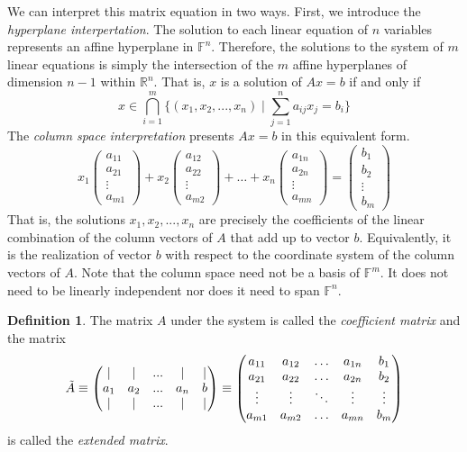 \documentclass{article}
\theoremstyle{remark}
\theoremstyle{definition}
\newtheorem{definition}{Definition}[section]
\begin{document}
    We can interpret this matrix equation in two ways. First, we introduce the \textit{hyperplane interpertation}. The solution to each linear equation of $n$ variables represents an affine hyperplane in $\mathbb{F}^n$. Therefore, the solutions to the system of $m$ linear equations is simply the intersection of the $m$ affine hyperplanes of dimension $n-1$ within $\mathbb{R}^n$. That is, $x$ is a solution of $A x = b$ if and only if  
    \[ x \in \bigcap_{i = 1}^m \Big\{ (x_1, x_2, ..., x_n) \; | \; \sum_{j = 1}^n a_{i j} x_j = b_i \Big\} \]
    The \textit{column space interpretation} presents $A x = b$ in this equivalent form. 
    \[ x_1 \begin{pmatrix}
    a_{1 1} \\ a_{2 1} \\ \vdots \\ a_{m 1}
    \end{pmatrix} + x_2 \begin{pmatrix}
    a_{1 2} \\ a_{2 2} \\ \vdots \\ a_{m 2}
    \end{pmatrix} + \ldots + x_n \begin{pmatrix}
    a_{1 n} \\ a_{2 n} \\ \vdots \\ a_{m n}
    \end{pmatrix} = \begin{pmatrix}
    b_1 \\ b_2 \\ \vdots \\ b_m
    \end{pmatrix}\]
    That is, the solutions $x_1, x_2, ..., x_n$ are precisely the coefficients of the linear combination of the column vectors of $A$ that add up to vector $b$. Equivalently, it is the realization of vector $b$ with respect to the coordinate system of the column vectors of $A$. Note that the column space need not be a basis of $\mathbb{F}^m$. It does not need to be linearly independent nor does it need to span $\mathbb{F}^n$. 

    \begin{definition}
    The matrix $A$ under the system is called the \textit{coefficient matrix} and the matrix 
    \[\Tilde{A} \equiv \begin{pmatrix}
    | & | & ... & | & | \\
    a_1 & a_2 & ... & a_n & b \\
    | & | & ... & | & | 
    \end{pmatrix} \equiv \begin{pmatrix}
    a_{1 1} & a_{1 2} & \ldots& a_{1 n} & b_1\\
     a_{2 1} & a_{2 2} & \ldots & a_{2 n} & b_2\\
    \vdots & \vdots & \ddots & \vdots & \vdots\\
     a_{m 1} & a_{m 2} & \ldots & a_{m n} & b_m
    \end{pmatrix}\]
    is called the \textit{extended matrix}. 
    \end{definition}
\end{document}
